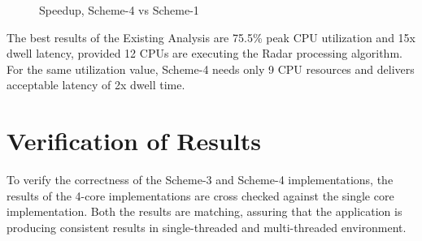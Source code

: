 \begin{figure}[h!]
\centering
\caption{Speedup, Scheme-4 vs Scheme-1}
\label{mm:scheme5_speedup}
\end{figure}

The best results of the Existing Analysis are 75.5\% peak CPU utilization and 15x dwell latency, provided 12 CPUs are executing the Radar processing algorithm. For the same utilization value, Scheme-4 needs only 9 CPU resources and delivers acceptable latency of 2x dwell time.

\clearpage
\section{Verification of Results}
\label{mm:sec:verification_of_results}
To verify the correctness of the Scheme-3 and Scheme-4 implementations, the results of the 4-core implementations are cross checked against the single core implementation. Both the results are matching, assuring that the application is producing consistent results in single-threaded and multi-threaded environment.